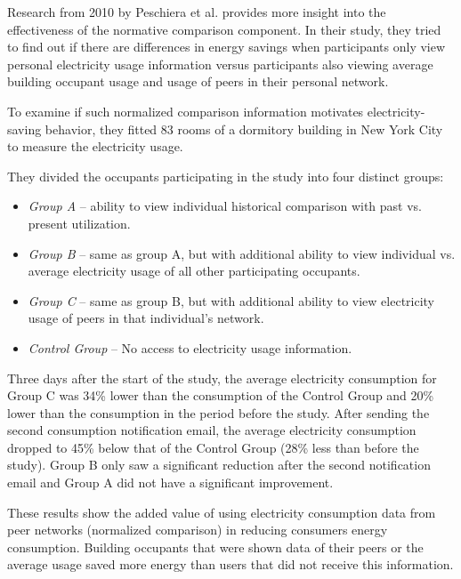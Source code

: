 \documentclass[journal]{vgtc}                %
\begin{document}
Research from 2010 by Peschiera et al.\cite{peschiera2010response} provides more insight into the effectiveness of the normative comparison component. In their study, they tried to find out if there are differences in energy savings when participants only view personal electricity usage information versus participants also viewing average building occupant usage and usage of peers in their personal network.

To examine if such normalized comparison information motivates electricity-saving behavior, they fitted 83 rooms of a dormitory building in New York City to measure the electricity usage.

They divided the occupants participating in the study into four distinct groups:
\begin{itemize}
\item \textit{Group A} -- ability to view individual historical comparison with past vs. present utilization.
\item \textit{Group B} -- same as group A, but with additional ability to view individual vs. average electricity usage of all other participating occupants.
\item \textit{Group C} -- same as group B, but with additional ability to view electricity usage of peers in that individual's network.
\item \textit{Control Group} -- No access to electricity usage information.
\end{itemize}


Three days after the start of the study, the average electricity consumption for Group C was 34\% lower than the consumption of the Control Group and 20\% lower than the consumption in the period before the study.
After sending the second consumption notification email, the average electricity consumption dropped to 45\% below that of the Control Group (28\% less than before the study).
Group B only saw a significant reduction after the second notification email and Group A did not have a significant improvement.

These results show the added value of using electricity consumption data from peer networks (normalized comparison) in reducing consumers energy consumption. Building occupants that were shown data of their peers or the average usage saved more energy than users that did not receive this information.
~\\
\end{document}
